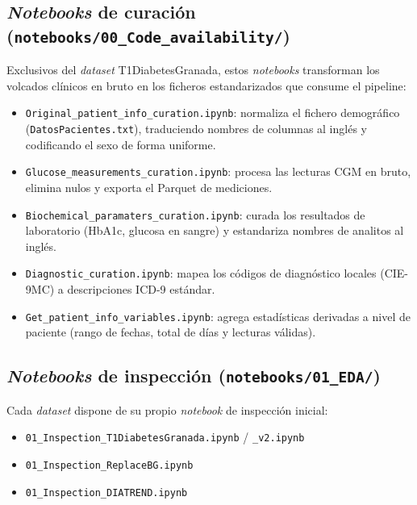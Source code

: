\subsection{\textit{Notebooks} de curación
            (\texttt{notebooks/00\_Code\_availability/})}
\label{subsec:anexo_curacion}

Exclusivos del \textit{dataset} T1DiabetesGranada, estos \textit{notebooks}
transforman los volcados clínicos en bruto en los ficheros
estandarizados que consume el pipeline:

\begin{itemize}
    \item \texttt{Original\_patient\_info\_curation.ipynb}: normaliza el
    fichero demográfico (\texttt{DatosPacientes.txt}), traduciendo nombres
    de columnas al inglés y codificando el sexo de forma uniforme.
    \item \texttt{Glucose\_measurements\_curation.ipynb}: procesa las
    lecturas CGM en bruto, elimina nulos y exporta el Parquet de
    mediciones.
    \item \texttt{Biochemical\_paramaters\_curation.ipynb}: curada los
    resultados de laboratorio (HbA1c, glucosa en sangre) y estandariza
    nombres de analitos al inglés.
    \item \texttt{Diagnostic\_curation.ipynb}: mapea los códigos de
    diagnóstico locales (CIE-9MC) a descripciones ICD-9 estándar.
    \item \texttt{Get\_patient\_info\_variables.ipynb}: agrega estadísticas
    derivadas a nivel de paciente (rango de fechas, total de días y
    lecturas válidas).
\end{itemize}

\subsection{\textit{Notebooks} de inspección
            (\texttt{notebooks/01\_EDA/})}
\label{subsec:anexo_inspeccion}

Cada \textit{dataset} dispone de su propio \textit{notebook} de
inspección inicial:

\begin{itemize}
    \item \texttt{01\_Inspection\_T1DiabetesGranada.ipynb} /
          \texttt{\_v2.ipynb}
    \item \texttt{01\_Inspection\_ReplaceBG.ipynb}
    \item \texttt{01\_Inspection\_DIATREND.ipynb}
\end{itemize}

